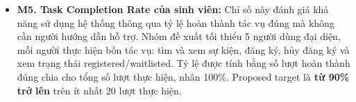 \begin{itemize}
\item \textbf{M5. Task Completion Rate của sinh viên:} Chỉ số này đánh giá khả năng sử dụng hệ thống thông qua tỷ lệ hoàn thành tác vụ đúng mà không cần người hướng dẫn hỗ trợ. Nhóm đề xuất tối thiểu 5 người dùng đại diện, mỗi người thực hiện bốn tác vụ: tìm và xem sự kiện, đăng ký, hủy đăng ký và xem trạng thái registered/waitlisted. Tỷ lệ được tính bằng số lượt hoàn thành đúng chia cho tổng số lượt thực hiện, nhân 100\%. Proposed target là \textbf{từ 90\% trở lên} trên ít nhất 20 lượt thực hiện.
\end{itemize}